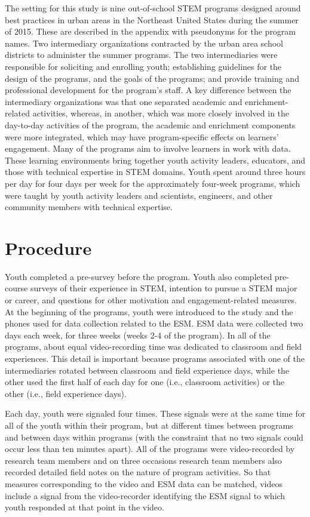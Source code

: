 \documentclass[]{msu-thesis}
\theoremstyle{definition}
\theoremstyle{definition}
\theoremstyle{definition}
\theoremstyle{remark}
\begin{document}
The setting for this study is nine out-of-school STEM programs designed
around best practices in urban areas in the Northeast United States
during the summer of 2015. These are described in the appendix with
pseudonyms for the program names. Two intermediary organizations
contracted by the urban area school districts to administer the summer
programs. The two intermediaries were responsible for soliciting and
enrolling youth; establishing guidelines for the design of the programs,
and the goals of the programs; and provide training and professional
development for the program's staff. A key difference between the
intermediary organizations was that one separated academic and
enrichment-related activities, whereas, in another, which was more
closely involved in the day-to-day activities of the program, the
academic and enrichment components were more integrated, which may have
program-specific effects on learners' engagement. Many of the programs
aim to involve learners in work with data. These learning environments
bring together youth activity leaders, educators, and those with
technical expertise in STEM domains. Youth spent around three hours per
day for four days per week for the approximately four-week programs,
which were taught by youth activity leaders and scientists, engineers,
and other community members with technical expertise.

\section{Procedure}\label{procedure}

Youth completed a pre-survey before the program. Youth also completed
pre-course surveys of their experience in STEM, intention to pursue a
STEM major or career, and questions for other motivation and
engagement-related measures. At the beginning of the programs, youth
were introduced to the study and the phones used for data collection
related to the ESM. ESM data were collected two days each week, for
three weeks (weeks 2-4 of the program). In all of the programs, about
equal video-recording time was dedicated to classroom and field
experiences. This detail is important because programs associated with
one of the intermediaries rotated between classroom and field experience
days, while the other used the first half of each day for one (i.e.,
classroom activities) or the other (i.e., field experience days).

Each day, youth were signaled four times. These signals were at the same
time for all of the youth within their program, but at different times
between programs and between days within programs (with the constraint
that no two signals could occur less than ten minutes apart). All of the
programs were video-recorded by research team members and on three
occasions research team members also recorded detailed field notes on
the nature of program activities. So that measures corresponding to the
video and ESM data can be matched, videos include a signal from the
video-recorder identifying the ESM signal to which youth responded at
that point in the video.
\end{document}
